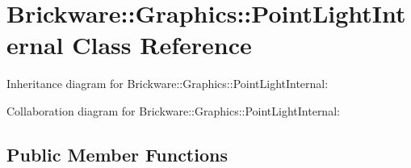 \hypertarget{classBrickware_1_1Graphics_1_1PointLightInternal}{}\section{Brickware\+:\+:Graphics\+:\+:Point\+Light\+Internal Class Reference}
\label{classBrickware_1_1Graphics_1_1PointLightInternal}


Inheritance diagram for Brickware\+:\+:Graphics\+:\+:Point\+Light\+Internal\+:


Collaboration diagram for Brickware\+:\+:Graphics\+:\+:Point\+Light\+Internal\+:
\subsection*{Public Member Functions}
